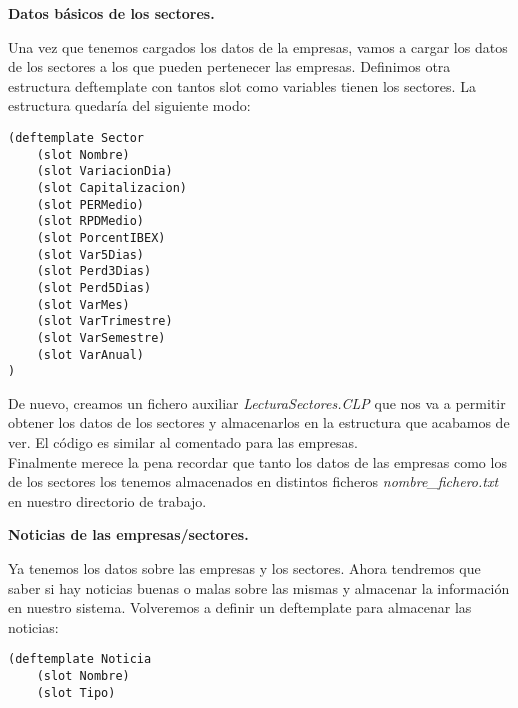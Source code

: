 \documentclass[12pt]{article}
\begin{document}
\begin{center}
	\textbf{Datos básicos de los sectores.}
\end{center}
Una vez que tenemos cargados los datos de la empresas, vamos a cargar los datos de los sectores a los que pueden pertenecer las empresas. Definimos otra estructura deftemplate con tantos slot como variables tienen los sectores. La estructura quedaría del siguiente modo:
\begin{lstlisting}
(deftemplate Sector
	(slot Nombre)
	(slot VariacionDia)
	(slot Capitalizacion)
	(slot PERMedio)
	(slot RPDMedio)
	(slot PorcentIBEX)
	(slot Var5Dias)
	(slot Perd3Dias)
	(slot Perd5Dias)
	(slot VarMes)	
	(slot VarTrimestre)
	(slot VarSemestre)
	(slot VarAnual)
)
\end{lstlisting}
De nuevo, creamos un fichero auxiliar \textit{LecturaSectores.CLP} que nos va a permitir obtener los datos de los sectores y almacenarlos en la estructura que acabamos de ver. El código es similar al comentado para las empresas. \\
Finalmente merece la pena recordar que tanto los datos de las empresas como los de los sectores los tenemos almacenados en distintos ficheros \textit{nombre\_fichero.txt} en nuestro directorio de trabajo.

\begin{center}
	\textbf{Noticias de las empresas/sectores.}
\end{center}
Ya tenemos los datos sobre las empresas y los sectores. Ahora tendremos que saber si hay noticias buenas o malas sobre las mismas y almacenar la información en nuestro sistema. Volveremos a definir un deftemplate para almacenar las noticias:
\begin{lstlisting}
(deftemplate Noticia
	(slot Nombre)
	(slot Tipo)
	(slot Antiguedad)
)
\end{lstlisting}
A diferencia de los datos de las empresas y de los sectores, las noticias se las tendremos que pedir al usuario. Éste será el encargado de proporcionar el fichero \textit{nombre\_noticias.txt} que contiene las noticias. \\
Volvemos a crear un fichero auxiliar \textit{LecturaNoticias.CLP} donde hacemos la lectura del fichero que nos indica el usuario (sería la misma regla que con la lectura de las empresas y los sectores, con la diferencia de que ahora el nombre del archivo lo tiene que proporcionar el usuario por teclado), cargamos las noticias en la estructura definida y cerramos el archivo. 
\end{document}
